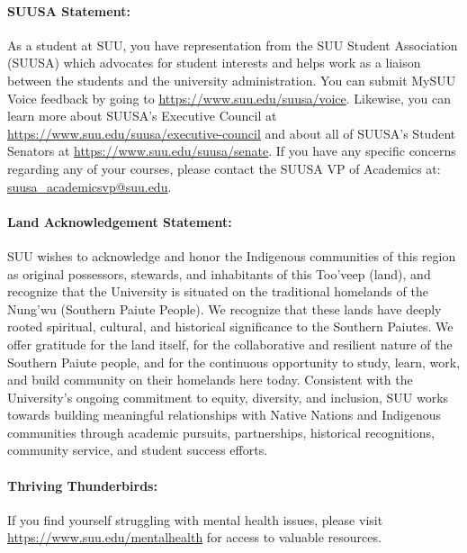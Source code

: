 \documentclass[12pt, letterpaper]{article}
\begin{document}
\paragraph{SUUSA Statement:}

As a student at SUU, you have representation from the SUU Student Association (SUUSA) which advocates for student interests and helps work as a liaison between the students and the university administration. You can submit MySUU Voice feedback by going to \href{https://www.suu.edu/suusa/voice}{https://www.suu.edu/suusa/voice}. Likewise, you can learn more about SUUSA’s Executive Council at \href{https://www.suu.edu/suusa/executive-council}{https://www.suu.edu/suusa/executive-council} and about all of SUUSA’s Student Senators at \href{https://www.suu.edu/suusa/senate}{https://www.suu.edu/suusa/senate}. If you have any specific concerns regarding any of your courses, please contact the SUUSA VP of Academics at: \href{suusa_academicsvp@suu.edu}{suusa\_\ignorespaces academicsvp@suu.edu}.

\paragraph{Land Acknowledgement Statement:}
SUU wishes to acknowledge and honor the Indigenous communities of this region as original possessors, stewards, and inhabitants of this Too’veep (land), and recognize that the University is situated on the traditional homelands of the Nung’wu (Southern Paiute People). We recognize that these lands have deeply rooted spiritual, cultural, and historical significance to the Southern Paiutes. We offer gratitude for the land itself, for the collaborative and resilient nature of the Southern Paiute people, and for the continuous opportunity to study, learn, work, and build community on their homelands here today. Consistent with the University's ongoing commitment to equity, diversity, and inclusion, SUU works towards building meaningful relationships with Native Nations and Indigenous communities through academic pursuits, partnerships, historical recognitions, community service, and student success efforts.

\paragraph{Thriving Thunderbirds:}
If you find yourself struggling with mental health issues, please visit \href{https://www.suu.edu/mentalhealth}{https://www.suu.edu/mentalhealth} for access to valuable resources. 
\end{document}
